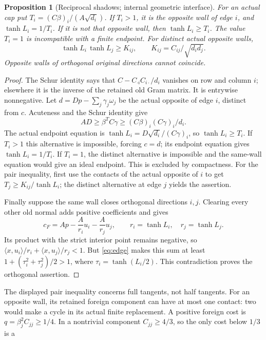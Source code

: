 \documentclass[11pt]{article}
\newtheorem{proposition}[theorem]{Proposition}
\theoremstyle{remark}\newtheorem{remark}[theorem]{Remark}
\numberwithin{equation}{section}
\newcommand{\ip}[2]{\langle #1,#2\rangle}
\begin{document}
\begin{proposition}[Reciprocal shadows; internal geometric interface]
\label{prop:shadows}For an actual cap put \(T_i=(C\beta)_i/(A\sqrt{d_i})\).
If \(T_i>1\), it is the opposite wall of edge \(i\), and
 \(\tanh L_i=1/T_i\). If it is not that opposite wall, then
 \(\tanh L_i\geq T_i\). The value \(T_i=1\) is incompatible
with a finite endpoint. For distinct actual opposite walls,
\begin{equation}\label{eq:shadow}\tanh L_i\,\tanh L_j\geq
 K_{ij},\qquad K_{ij}=C_{ij}/\sqrt{d_i d_j}.
\end{equation}
Opposite walls of orthogonal original directions cannot coincide.
\end{proposition}
\begin{proof}
The Schur identity says that
 \(C-C_{\cdot i}C_{i\cdot}/d_i\) vanishes on row and column \(i\);
elsewhere it is the inverse of the retained old Gram matrix.
It is entrywise nonnegative. Let \(d=Dp-\sum_j\gamma_j\omega_j\)
be the actual opposite of edge \(i\), distinct from \(c\).
Acuteness and the Schur identity give
 \[
 AD\geq\beta^TC\gamma
 \geq(C\beta)_i(C\gamma)_i/d_i.
\]
The actual endpoint equation is
 \(\tanh L_i=D\sqrt{d_i}/(C\gamma)_i\), so
 \(\tanh L_i\geq T_i\). If \(T_i>1\) this alternative is
impossible, forcing \(c=d\); its endpoint equation gives
 \(\tanh L_i=1/T_i\).
If \(T_i=1\), the distinct alternative is impossible and the
same-wall equation would give an ideal endpoint. This is
excluded by compactness.
For the pair inequality, first use the contacts of the actual
opposite of \(i\) to get \(T_j\geq K_{ij}/\tanh L_i\);
the distinct alternative at edge \(j\) yields the assertion.

Finally suppose the same wall closes orthogonal directions
 \(i,j\). Clearing every other old normal adds positive
coefficients and gives
 \[
 c_F=A p-\frac{A}{r_i}u_i-\frac{A}{r_j}u_j,\qquad
 r_i=\tanh L_i,\quad r_j=\tanh L_j.
\]
Its product with the strict interior point remains negative,
so \(\ip{x}{u_i}/r_i+\ip{x}{u_j}/r_j<1\).
But \eqref{eq:edge} makes this sum at least
 \(1+(\tau_i^2+\tau_j^2)/2>1\),
where \(\tau_i=\tanh(L_i/2)\). This contradiction proves
the orthogonal assertion.
\end{proof}
The displayed pair inequality concerns full tangents, not
half tangents.
For an opposite wall, its retained foreign component can have
at most one contact: two would make a cycle in its actual
finite replacement. A positive foreign cost is
 \(q=\beta_j^2C_{jj}\geq1/4\). In a nontrivial component
 \(C_{jj}\geq4/3\), so the only cost below \(1/3\) is a
\end{document}
